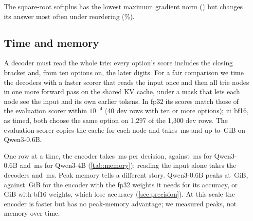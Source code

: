 The square-root softplus has the lowest maximum gradient norm (\CpGradSqrt{}) but changes its answer most often under reordering (\CpShufSqrt{}\%).

\begin{table}[t]
  \centering\small
  \caption{Sensitivity to option order and removal, on the dev set. Each row is scored in four random option orders; an
  answer change under reordering means the chosen option is not the same in all four. One wrong option, never the
  chosen one, is removed at random from rows with at least three options, and the answer is compared over the remaining
  options. Dev accuracy is on the first random order, so it differs slightly from \cref{tab:headline}, which keeps
  the original order. TV: total variation between the predicted and the gold frequencies, over the three datasets with
  a fixed label set (label) and over option positions (position). Calibration error: expected calibration error of the
  top option's probability. $|s_k|$: size of the raw option scores. Each metric is averaged over datasets, then over
  training runs. Bold: best in the row, higher for accuracy and lower for answer changes, TV and calibration error; the
  gradient norm, the largest over all training steps and so a single batch's value, and $|s_k|$ are not ranked.}
  \label{tab:coupling}
  
\end{table}

\subsection{Time and memory}
\label{sec:cost}

A decoder must read the whole trie: every option's score includes the closing bracket and, from ten options on, the later digits.
For a fair comparison we time the decoders with a faster scorer that reads the input once and then all trie nodes in one more forward pass on the shared KV cache, under a mask that lets each node see the input and its own earlier tokens.
In fp32 its scores match those of the evaluation scorer within $10^{-4}$ (40 dev rows with ten or more options); in bf16, as timed, both choose the same option on 1{,}297 of the 1{,}300 dev rows.
The evaluation scorer copies the cache for each node and takes \MsCopyQwFull{}\,ms and up to \MemPeakCopyQwFull{}\,GiB on Qwen3-0.6B.

One row at a time, the encoder takes \MsUb{}\,ms per decision, against \MsQwFull{}\,ms for Qwen3-0.6B and \MsQwFourLora{}\,ms for Qwen3-4B (\cref{tab:memory}); reading the input alone takes the decoders \MsPreQwFull{} and \MsPreQwFourLora{}\,ms.
Peak memory tells a different story.
Qwen3-0.6B peaks at \MemPeakQwFull{}\,GiB, against \MemPeakUb{}\,GiB for the encoder with the fp32 weights it needs for its accuracy, or \MemPeakUbBf{}\,GiB with bf16 weights, which lose accuracy (\cref{sec:precision}).
At this scale the encoder is faster but has no peak-memory advantage; we measured peaks, not memory over time.

